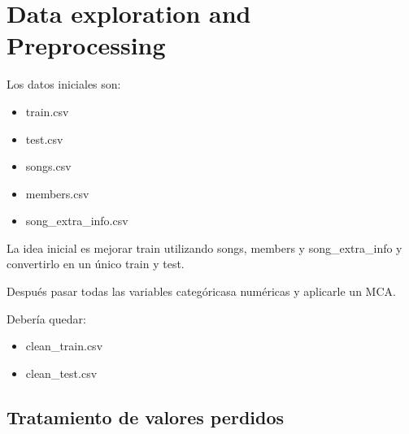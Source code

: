 \documentclass[a4paper]{article}
\begin{document}


\section{Data exploration and Preprocessing}

Los datos iniciales son: 
\begin{itemize}
\item train.csv
\item test.csv
\item songs.csv
\item members.csv
\item song\_extra\_info.csv
\end{itemize}

La idea inicial es mejorar train utilizando songs, members y song\_extra\_info y convertirlo en un único train y test. 

Después pasar todas las variables categóricasa numéricas y aplicarle un MCA.

Debería quedar: 
\begin{itemize}
\item clean\_train.csv
\item clean\_test.csv
\end{itemize}


\subsection{Tratamiento de valores perdidos}
\end{document}

